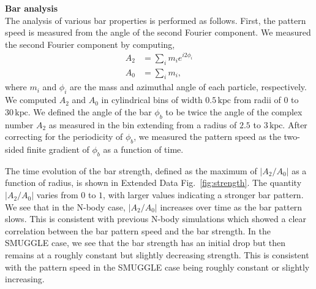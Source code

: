 \documentclass{natureprintstyle}
\begin{document}
\noindent
{\bf Bar analysis}
\\
\noindent
The analysis of various bar properties is performed as follows. First, the
pattern speed is measured from the angle of the second Fourier component. We
measured the second Fourier component by computing,
\begin{equation}
\begin{split}
A_2 &= \sum_i m_i e^{i 2 \phi_i} \\
A_0 &= \sum_i m_i \textrm{,}
\end{split}
\end{equation}
where $m_i$ and $\phi_i$ are the mass and azimuthal angle of each particle,
respectively. We computed $A_2$ and $A_0$ in cylindrical bins of width
$0.5\,\textrm{kpc}$ from radii of $0$ to $30\,\textrm{kpc}$. We defined the
angle of the bar $\phi_b$ to be twice the angle of the complex number $A_2$ as
measured in the bin extending from a radius of $2.5$ to $3\,\textrm{kpc}$.
After correcting for the periodicity of $\phi_b$, we measured the pattern
speed as the two-sided finite gradient of $\phi_b$ as a function of time.

The time evolution of the bar strength, defined as the maximum of
$\left|A_2/A_0\right|$ as a function of radius, is shown in Extended Data
Fig.~\ref{fig:strength}. The quantity $\left|A_2/A_0\right|$ varies from $0$
to $1$, with larger values indicating a stronger bar pattern. We see that in
the N-body case, $\left|A_2/A_0\right|$ increases over time as the bar pattern
slows. This is consistent with previous N-body simulations which showed a
clear correlation between the bar pattern speed and the bar
strength.\cite{2003MNRAS.341.1179A} In the SMUGGLE case, we see that the bar
strength has an initial drop but then remains at a roughly constant but
slightly decreasing strength. This is consistent with the pattern speed in the
SMUGGLE case being roughly constant or slightly increasing.
\end{document}
